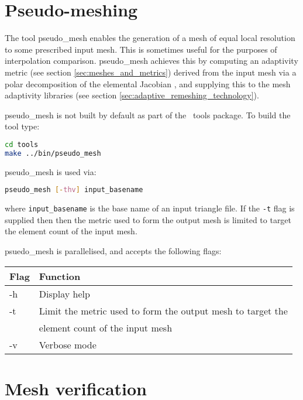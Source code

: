 \section{Pseudo-meshing}

The tool pseudo\_mesh enables the generation of a mesh of equal local resolution
to some prescribed input mesh. This is sometimes useful for the purposes of
interpolation comparison. pseudo\_mesh achieves this by computing an adaptivity
metric (see section \ref{sec:meshes_and_metrics}) derived from the input mesh
via a polar decomposition of the
elemental Jacobian \citep{micheletti2006}, and supplying this to the mesh adaptivity libraries
(see section \ref{sec:adaptive_remeshing_technology}).

pseudo\_mesh is not built by default as part of the \fluidity\ tools package. To
build the tool type:

\begin{lstlisting}[language = Bash]
cd tools
make ../bin/pseudo_mesh
\end{lstlisting}

pseudo\_mesh is used via:

\begin{lstlisting}[language = Bash]
pseudo_mesh [-thv] input_basename
\end{lstlisting}

where \lstinline[language = Bash]*input_basename* is the base name of an input
triangle file. If the \lstinline[language = Bash]*-t* flag is supplied then
then the metric used to form the output mesh is limited to target the element
count of the input mesh.

psuedo\_mesh is parallelised, and accepts the following flags:

\begin{center}
  \begin{tabular}{| l | l |}
    \hline
    Flag & Function \\
    \hline
    -h   & Display help \\
    -t   & Limit the metric used to form the output mesh to target the \\
         & element count of the input mesh \\
    -v   & Verbose mode \\
    \hline
  \end{tabular}
\end{center}

\section{Mesh verification}

